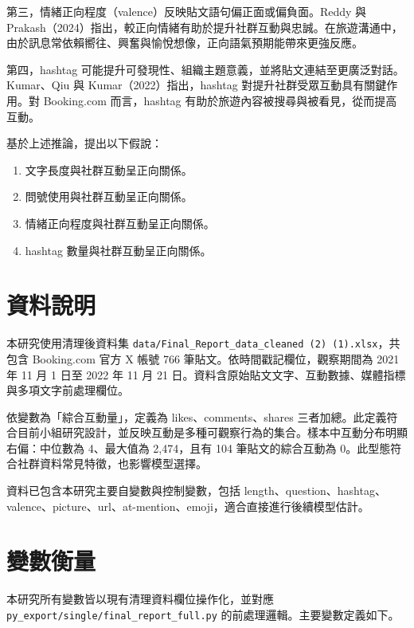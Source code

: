 \documentclass[12pt,a4paper]{ctexart}
\begin{document}
第三，情緒正向程度（valence）反映貼文語句偏正面或偏負面。Reddy 與 Prakash（2024）指出，較正向情緒有助於提升社群互動與忠誠。在旅遊溝通中，由於訊息常依賴嚮往、興奮與愉悅想像，正向語氣預期能帶來更強反應。

第四，hashtag 可能提升可發現性、組織主題意義，並將貼文連結至更廣泛對話。Kumar、Qiu 與 Kumar（2022）指出，hashtag 對提升社群受眾互動具有關鍵作用。對 Booking.com 而言，hashtag 有助於旅遊內容被搜尋與被看見，從而提高互動。

基於上述推論，提出以下假說：
\begin{enumerate}[label=H\arabic*.]
    \item 文字長度與社群互動呈正向關係。
    \item 問號使用與社群互動呈正向關係。
    \item 情緒正向程度與社群互動呈正向關係。
    \item hashtag 數量與社群互動呈正向關係。
\end{enumerate}

\section{資料說明}
本研究使用清理後資料集 \texttt{data/Final\_Report\_data\_cleaned (2) (1).xlsx}，共包含 Booking.com 官方 X 帳號 766 筆貼文。依時間戳記欄位，觀察期間為 2021 年 11 月 1 日至 2022 年 11 月 21 日。資料含原始貼文文字、互動數據、媒體指標與多項文字前處理欄位。

依變數為「綜合互動量」，定義為 likes、comments、shares 三者加總。此定義符合目前小組研究設計，並反映互動是多種可觀察行為的集合。樣本中互動分布明顯右偏：中位數為 4、最大值為 2,474，且有 104 筆貼文的綜合互動為 0。此型態符合社群資料常見特徵，也影響模型選擇。

資料已包含本研究主要自變數與控制變數，包括 length、question、hashtag、valence、picture、url、at-mention、emoji，適合直接進行後續模型估計。

\section{變數衡量}
本研究所有變數皆以現有清理資料欄位操作化，並對應 \texttt{py\_export/single/final\_report\_full.py} 的前處理邏輯。主要變數定義如下。
\end{document}

